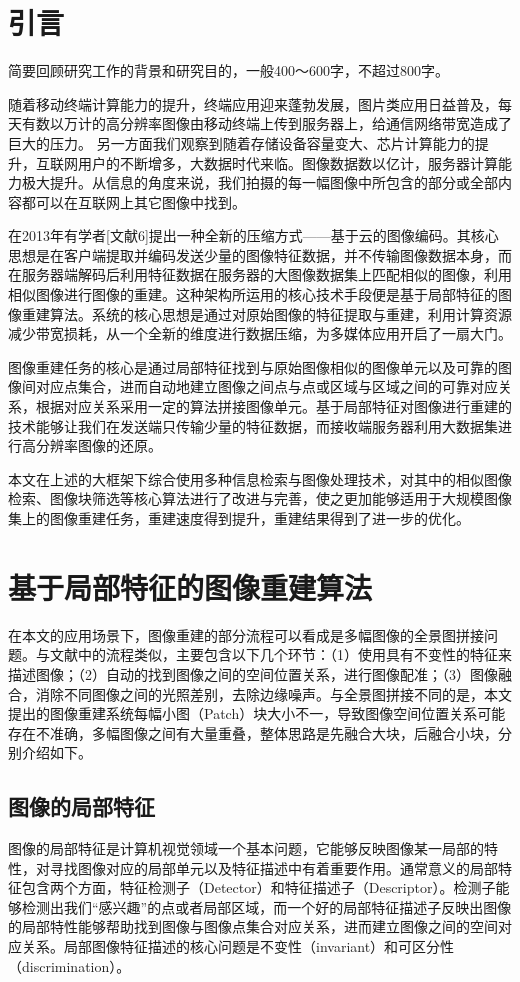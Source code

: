 \documentclass[UTF8]{csoarticle}
\begin{document}
\section{引言}

简要回顾研究工作的背景和研究目的，一般400～600字，不超过800字。

随着移动终端计算能力的提升，终端应用迎来蓬勃发展，图片类应用日益普及，每天有数以万计的高分辨率图像由移动终端上传到服务器上，给通信网络带宽造成了巨大的压力。
另一方面我们观察到随着存储设备容量变大、芯片计算能力的提升，互联网用户的不断增多，大数据时代来临。图像数据数以亿计，服务器计算能力极大提升。从信息的角度来说，我们拍摄的每一幅图像中所包含的部分或全部内容都可以在互联网上其它图像中找到。

在2013年有学者[文献6]提出一种全新的压缩方式——基于云的图像编码。其核心思想是在客户端提取并编码发送少量的图像特征数据，并不传输图像数据本身，而在服务器端解码后利用特征数据在服务器的大图像数据集上匹配相似的图像，利用相似图像进行图像的重建。这种架构所运用的核心技术手段便是基于局部特征的图像重建算法。系统的核心思想是通过对原始图像的特征提取与重建，利用计算资源减少带宽损耗，从一个全新的维度进行数据压缩，为多媒体应用开启了一扇大门。

图像重建任务的核心是通过局部特征找到与原始图像相似的图像单元以及可靠的图像间对应点集合，进而自动地建立图像之间点与点或区域与区域之间的可靠对应关系，根据对应关系采用一定的算法拼接图像单元。基于局部特征对图像进行重建的技术能够让我们在发送端只传输少量的特征数据，而接收端服务器利用大数据集进行高分辨率图像的还原。

本文在上述的大框架下综合使用多种信息检索与图像处理技术，对其中的相似图像检索、图像块筛选等核心算法进行了改进与完善，使之更加能够适用于大规模图像集上的图像重建任务，重建速度得到提升，重建结果得到了进一步的优化。

\section{基于局部特征的图像重建算法}
在本文的应用场景下，图像重建的部分流程可以看成是多幅图像的全景图拼接问题。与文献\cite{Brown:2006ir}中的流程类似，主要包含以下几个环节：（1）使用具有不变性的特征来描述图像；（2）自动的找到图像之间的空间位置关系，进行图像配准；（3）图像融合，消除不同图像之间的光照差别，去除边缘噪声。与全景图拼接不同的是，本文提出的图像重建系统每幅小图（Patch）块大小不一，导致图像空间位置关系可能存在不准确，多幅图像之间有大量重叠，整体思路是先融合大块，后融合小块，分别介绍如下。

\subsection{图像的局部特征}
图像的局部特征是计算机视觉领域一个基本问题，它能够反映图像某一局部的特性，对寻找图像对应的局部单元以及特征描述中有着重要作用。通常意义的局部特征包含两个方面，特征检测子（Detector）和特征描述子（Descriptor）。检测子能够检测出我们“感兴趣”的点或者局部区域，而一个好的局部特征描述子反映出图像的局部特性能够帮助找到图像与图像点集合对应关系，进而建立图像之间的空间对应关系。局部图像特征描述的核心问题是不变性（invariant）和可区分性（discrimination）。
\end{document}
